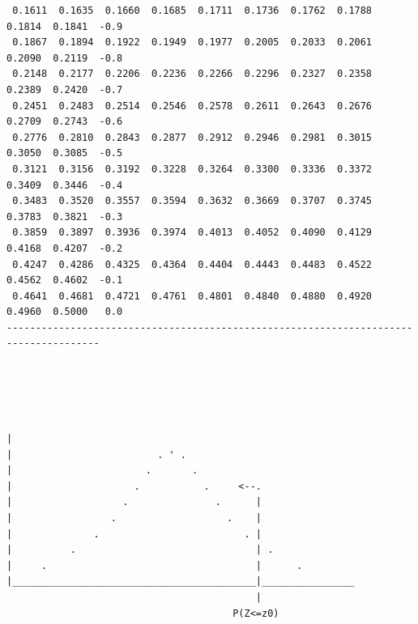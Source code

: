\begin{verbatim}
 0.1611  0.1635  0.1660  0.1685  0.1711  0.1736  0.1762  0.1788  0.1814  0.1841  -0.9
 0.1867  0.1894  0.1922  0.1949  0.1977  0.2005  0.2033  0.2061  0.2090  0.2119  -0.8
 0.2148  0.2177  0.2206  0.2236  0.2266  0.2296  0.2327  0.2358  0.2389  0.2420  -0.7
 0.2451  0.2483  0.2514  0.2546  0.2578  0.2611  0.2643  0.2676  0.2709  0.2743  -0.6
 0.2776  0.2810  0.2843  0.2877  0.2912  0.2946  0.2981  0.3015  0.3050  0.3085  -0.5
 0.3121  0.3156  0.3192  0.3228  0.3264  0.3300  0.3336  0.3372  0.3409  0.3446  -0.4
 0.3483  0.3520  0.3557  0.3594  0.3632  0.3669  0.3707  0.3745  0.3783  0.3821  -0.3
 0.3859  0.3897  0.3936  0.3974  0.4013  0.4052  0.4090  0.4129  0.4168  0.4207  -0.2
 0.4247  0.4286  0.4325  0.4364  0.4404  0.4443  0.4483  0.4522  0.4562  0.4602  -0.1
 0.4641  0.4681  0.4721  0.4761  0.4801  0.4840  0.4880  0.4920  0.4960  0.5000   0.0
--------------------------------------------------------------------------------------





|
|                         . ' .
|                       .       .
|                     .           .     <--.
|                   .               .      |
|                 .                   .    |
|              .                         . |
|          .                               | .
|     .                                    |      .
|__________________________________________|________________
                                           |
                                       P(Z<=z0)



\end{verbatim}
